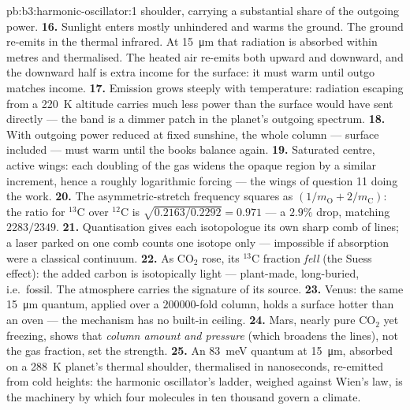 \begin{solution}{pb:b3:harmonic-oscillator:1}
shoulder, carrying a substantial share of the outgoing power.
\textbf{16.} Sunlight enters mostly unhindered and warms the
ground. The ground re-emits in the thermal infrared. At
\qty{15}{\micro m} that radiation is absorbed within metres and
thermalised. The heated air re-emits both upward and downward, and
the downward half is extra income for the surface: it must warm
until outgo matches income.
\textbf{17.} Emission grows steeply with temperature: radiation
escaping from a \qty{220}{K} altitude carries much less power than
the surface would have sent directly --- the band is a dimmer patch
in the planet's outgoing spectrum.
\textbf{18.} With outgoing power reduced at fixed sunshine, the
whole column --- surface included --- must warm until the books
balance again.
\textbf{19.} Saturated centre, active wings: each doubling of the
gas widens the opaque region by a similar increment, hence a
roughly logarithmic forcing --- the wings of question 11 doing the
work.
\textbf{20.} The asymmetric-stretch frequency squares as $(1/m_{
\text{O}} + 2/m_{\text{C}})$: the ratio for $^{13}$C over $^{12}$C
is $\sqrt{0.2163/0.2292} = 0.971$ --- a $2.9\%$ drop, matching
$2283/2349$.
\textbf{21.} Quantisation gives each isotopologue its own sharp
comb of lines; a laser parked on one comb counts one isotope only
--- impossible if absorption were a classical continuum.
\textbf{22.} As CO$_2$ rose, its $^{13}$C fraction \emph{fell}
(the Suess effect): the added carbon is isotopically light ---
plant-made, long-buried, i.e.\ fossil. The atmosphere carries the
signature of its source.
\textbf{23.} Venus: the same \qty{15}{\micro m} quantum, applied
over a $200000$-fold column, holds a surface hotter than an oven
--- the mechanism has no built-in ceiling.
\textbf{24.} Mars, nearly pure CO$_2$ yet freezing, shows that
\emph{column amount and pressure} (which broadens the lines), not
the gas fraction, set the strength.
\textbf{25.} An \qty{83}{meV} quantum at \qty{15}{\micro m},
absorbed on a \qty{288}{K} planet's thermal shoulder, thermalised
in nanoseconds, re-emitted from cold heights: the harmonic
oscillator's ladder, weighed against Wien's law, is the machinery
by which four molecules in ten thousand govern a climate.
\end{solution}
